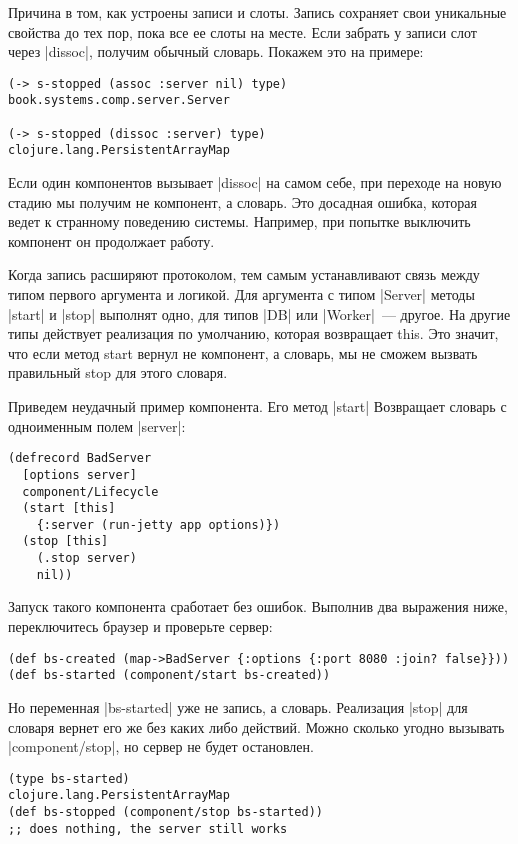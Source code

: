 Причина в том, как устроены записи и слоты. Запись сохраняет свои уникальные
свойства до тех пор, пока все ее слоты на месте. Если забрать у записи слот
через \spverb|dissoc|, получим обычный словарь. Покажем это на примере:

\begin{verbatim}
(-> s-stopped (assoc :server nil) type)
book.systems.comp.server.Server

(-> s-stopped (dissoc :server) type)
clojure.lang.PersistentArrayMap
\end{verbatim}

Если один компонентов вызывает \spverb|dissoc| на самом себе, при переходе на новую
стадию мы получим не компонент, а словарь. Это досадная ошибка, которая ведет к
странному поведению системы. Например, при попытке выключить компонент он
продолжает работу.

Когда запись расширяют протоколом, тем самым устанавливают связь между типом
первого аргумента и логикой. Для аргумента с типом \spverb|Server| методы \spverb|start| и
\spverb|stop| выполнят одно, для типов \spverb|DB| или \spverb|Worker|~--- другое. На другие типы
действует реализация по умолчанию, которая возвращает this. Это значит, что если
метод start вернул не компонент, а словарь, мы не сможем вызвать правильный stop
для этого словаря.

Приведем неудачный пример компонента. Его метод \spverb|start| Возвращает словарь с
одноименным полем \spverb|server|:

\begin{verbatim}
(defrecord BadServer
  [options server]
  component/Lifecycle
  (start [this]
    {:server (run-jetty app options)})
  (stop [this]
    (.stop server)
    nil))
\end{verbatim}

Запуск такого компонента сработает без ошибок. Выполнив два выражения ниже,
переключитесь браузер и проверьте сервер:

\begin{verbatim}
(def bs-created (map->BadServer {:options {:port 8080 :join? false}}))
(def bs-started (component/start bs-created))
\end{verbatim}

Но переменная \spverb|bs-started| уже не запись, а словарь. Реализация \spverb|stop| для
словаря вернет его же без каких либо действий. Можно сколько угодно вызывать
\spverb|component/stop|, но сервер не будет остановлен.

\begin{verbatim}
(type bs-started)
clojure.lang.PersistentArrayMap
(def bs-stopped (component/stop bs-started))
;; does nothing, the server still works
\end{verbatim}

